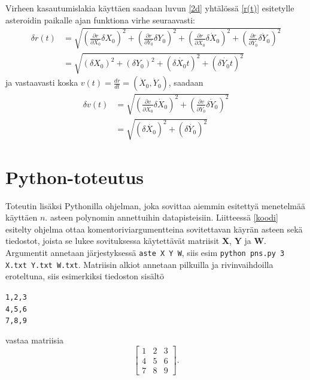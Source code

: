\documentclass[12pt,a4paper,titlepage]{article}
\newcommand{\matr}[1]{\bm{#1}}
\begin{document}
Virheen kasautumislakia käyttäen saadaan luvun \ref{2d} yhtälössä \ref{r(t)} esitetylle asteroidin paikalle ajan funktiona virhe seuraavasti:
\begin{align}
	\delta r(t) &= \sqrt{\left(\frac{\partial r}{\partial{X_0}} \delta X_0 \right)^2 + \left(\frac{\partial r}{\partial{Y_0}} \delta Y_0 \right)^2 + \left(\frac{\partial r}{\partial\dot{X_0}} \delta \dot X_0 \right)^2 + \left(\frac{\partial r}{\partial\dot{Y_0}} \delta \dot Y_0 \right)^2 } \nonumber\\
	 &= \sqrt{ \left(\delta{X_0}\right)^2 + \left(\delta{Y_0}\right)^2 + \left(\delta\dot{X_0}t\right)^2 + \left(\delta\dot{Y_0}t\right)^2}
\end{align}
ja vastaavasti koska $v(t) = \frac{dr}{dt} = (\dot X_0, \dot Y_0)$, saadaan
\begin{align}
	\delta v(t) &= \sqrt{\left(\frac{\partial v}{\partial\dot{X_0}} \delta \dot X_0 \right)^2 + \left(\frac{\partial v}{\partial\dot{Y_0}} \delta \dot Y_0 \right)^2 } \nonumber\\
	 &= \sqrt{ \left(\delta\dot{X_0}\right)^2 + \left(\delta\dot{Y_0}\right)^2}
\end{align}

\section{Python-toteutus}
Toteutin lisäksi Pythonilla ohjelman, joka sovittaa aiemmin esitettyä menetelmää käyttäen $n$. asteen polynomin annettuihin datapisteisiin. Liitteessä \ref{koodi} esitelty ohjelma ottaa komentoriviargumentteina sovitettavan käyrän asteen sekä tiedostot, joista se lukee sovituksessa käytettävät matriisit $\matr{X}$, $\matr{Y}$ ja $\matr{W}$. Argumentit annetaan järjestyksessä \texttt{aste X Y W}, siis esim \texttt{python pns.py 3 X.txt Y.txt W.txt}. Matriisin alkiot annetaan pilkuilla ja rivinvaihdoilla eroteltuna, siis esimerkiksi tiedoston sisältö\\
\begin{center}
	\texttt{1,2,3\\
		4,5,6\\
		7,8,9}\\
\end{center}
vastaa matriisia
\begin{equation*}
	\begin{bmatrix}
		1 & 2 & 3 \\
		4 & 5 & 6 \\
		7 & 8 & 9
	\end{bmatrix}.
\end{equation*}
\end{document}
